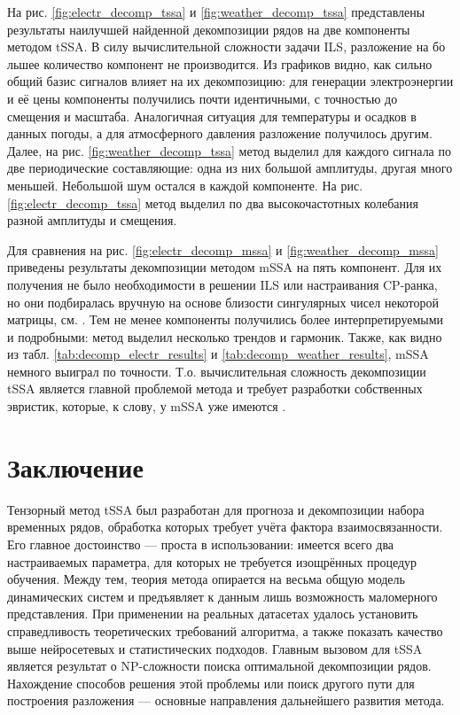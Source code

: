 			На рис. \ref{fig:electr_decomp_tssa} и \ref{fig:weather_decomp_tssa} представлены результаты наилучшей найденной декомпозиции рядов на две компоненты методом tSSA. В силу вычислительной сложности задачи ILS, разложение на б$\acute{\text{о}}$льшее количество компонент не производится. Из графиков видно, как сильно общий базис сигналов влияет на их декомпозицию: для генерации электроэнергии и её цены компоненты получились почти идентичными, с точностью до смещения и масштаба. Аналогичная ситуация для температуры и осадков в данных погоды, а для атмосферного давления разложение получилось другим. Далее, на рис. \ref{fig:weather_decomp_tssa} метод выделил для каждого сигнала по две периодические составляющие: одна из них большой амплитуды, другая много меньшей. Небольшой шум остался в каждой компоненте. На рис. \ref{fig:electr_decomp_tssa} метод выделил по два высокочастотных колебания разной амплитуды и смещения.
			
			Для сравнения на рис. \ref{fig:electr_decomp_mssa} и \ref{fig:weather_decomp_mssa} приведены результаты декомпозиции методом mSSA на пять компонент. Для их получения не было необходимости в решении ILS или настраивания CP-ранка, но они подбиралась вручную на основе близости сингулярных чисел некоторой матрицы, см. \cite{ecfb9dc578be43ae9ee8fc88b8ff9151}. Тем не менее компоненты получились более интерпретируемыми и подробными: метод выделил несколько трендов и гармоник. Также, как видно из табл. \ref{tab:decomp_electr_results} и \ref{tab:decomp_weather_results}, mSSA немного выиграл по точности. Т.о. вычислительная сложность декомпозиции tSSA является главной проблемой метода и требует разработки собственных эвристик, которые, к слову, у mSSA уже имеются \cite{ecfb9dc578be43ae9ee8fc88b8ff9151}.		
			
		\section{Заключение}
		
		Тензорный метод tSSA был разработан для прогноза и декомпозиции набора временных рядов, обработка которых требует учёта фактора взаимосвязанности. Его главное достоинство --- проста в использовании: имеется всего два настраиваемых параметра, для которых не требуется изощрённых процедур обучения. Между тем, теория метода опирается на весьма общую модель динамических систем и предъявляет к данным лишь возможность маломерного представления. При применении на реальных датасетах удалось установить справедливость теоретических требований алгоритма, а также показать качество выше нейросетевых и статистических подходов. Главным вызовом для tSSA является результат о NP-сложности поиска оптимальной декомпозиции рядов. Нахождение способов решения этой проблемы или поиск другого пути для построения разложения --- основные направления дальнейшего развития метода.
		

